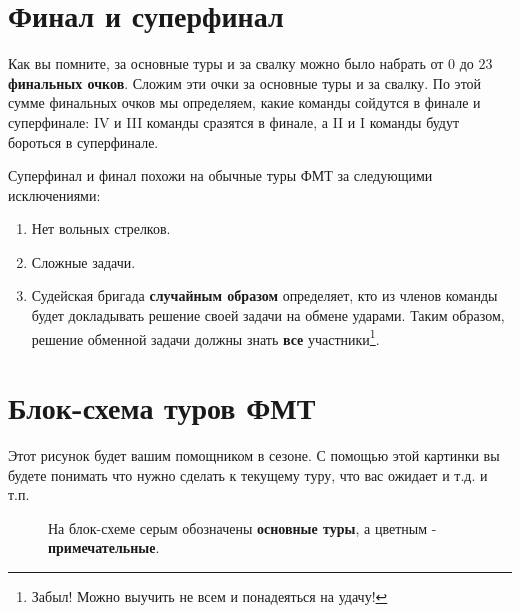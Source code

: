 \documentclass[12pt]{article}
\begin{document}
\section*{Финал и суперфинал}
Как вы помните, за основные туры и за свалку можно было набрать от $0$ до $23$ {\bf финальных очков}. Сложим эти очки за основные туры и за свалку. По этой сумме финальных очков мы определяем, какие команды сойдутся в финале и суперфинале: IV и III команды сразятся в финале, а II и I команды будут бороться в суперфинале.

Суперфинал и финал похожи на обычные туры ФМТ за следующими исключениями:
\begin{enumerate}
\item Нет вольных стрелков.
\item Сложные задачи.
\item Судейская бригада {\bf случайным образом} определяет, кто из членов команды будет докладывать решение своей задачи на обмене ударами. Таким образом, решение обменной задачи должны знать {\bf все} участники\footnote{Забыл! Можно выучить не всем и понадеяться на удачу!}.
\end{enumerate}

\section*{Блок-схема туров ФМТ}
Этот рисунок будет вашим помощником в сезоне. С помощью этой картинки вы будете понимать что нужно сделать к текущему туру, что вас ожидает и т.д. и т.п.
\begin{figure}[h!]
	\caption{На блок-схеме серым обозначены \textbf{основные туры}, а цветным - \textbf{примечательные}.}
\end{figure}
\end{document}

